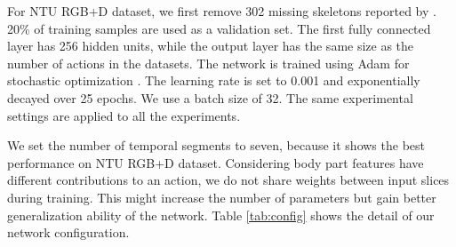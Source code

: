\documentclass{bmvc2k}
\begin{document}
For NTU RGB+D dataset, we first remove 302 missing skeletons reported by \cite{shahroudy2016ntu}. 20\% of training samples are used as a validation set. The first fully connected layer has 256 hidden units, while the output layer has the same size as the number of actions in the datasets. The network is trained using Adam for stochastic optimization \cite{kingma2014adam}. The learning rate is set to 0.001 and exponentially decayed over 25 epochs. We use a batch size of 32. The same experimental settings are applied to all the experiments. 

We set the number of temporal segments to seven, because it shows the best performance on NTU RGB+D dataset. Considering body part features have different contributions to an action, we do not share weights between input slices during training. This might increase the number of parameters but gain better generalization ability of the network. Table \ref{tab:config} shows the detail of our network configuration. 
\end{document}
